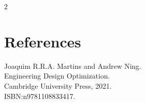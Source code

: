 \documentclass[11pt]{article}
\begin{document}
\begin{multicols}{2}
\section{References}
\noindent
Joaquim R.R.A. Martins and Andrew Ning. \\ \hspace{12pt} 
Engineering Design Optimization. \\ 
\hspace{12pt} Cambridge University Press, 2021. \\ 
\hspace{12pt} ISBN:n9781108833417. 
    
\end{multicols}

\end{document}
